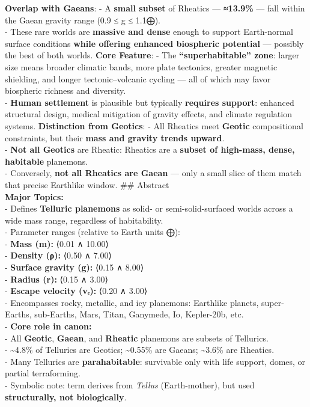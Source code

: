 \documentclass[
  letterpaper,
]{book}
\begin{document}
\textbf{Overlap with Gaeans}: - A \textbf{small subset} of Rheatics ---
\textbf{≈13.9\%} --- fall within the Gaean gravity range (0.9 ≤ g ≤
1.1⨁).\\
- These rare worlds are \textbf{massive and dense} enough to support
Earth-normal surface conditions \textbf{while offering enhanced
biospheric potential} --- possibly the best of both worlds. \textbf{Core
Feature}: - The \textbf{``superhabitable'' zone}: larger size means
broader climatic bands, more plate tectonics, greater magnetic
shielding, and longer tectonic--volcanic cycling --- all of which may
favor biospheric richness and diversity.\\
- \textbf{Human settlement} is plausible but typically \textbf{requires
support}: enhanced structural design, medical mitigation of gravity
effects, and climate regulation systems. \textbf{Distinction from
Geotics}: - All Rheatics meet \textbf{Geotic} compositional constraints,
but their \textbf{mass and gravity trends upward}.\\
- \textbf{Not all Geotics} are Rheatic: Rheatics are a \textbf{subset of
high-mass, dense, habitable} planemons.\\
- Conversely, \textbf{not all Rheatics are Gaean} --- only a small slice
of them match that precise Earthlike window. \#\# Abstract\\
\textbf{Major Topics:}\\
- Defines \textbf{Telluric planemons} as solid- or semi-solid-surfaced
worlds across a wide mass range, regardless of habitability.\\
- Parameter ranges (relative to Earth units ⨁):\\
- \textbf{Mass (m):} ⟨0.01 ∧ 10.00⟩\\
- \textbf{Density (ρ):} ⟨0.50 ∧ 7.00⟩\\
- \textbf{Surface gravity (g):} ⟨0.15 ∧ 8.00⟩\\
- \textbf{Radius (r):} ⟨0.15 ∧ 3.00⟩\\
- \textbf{Escape velocity (vₑ):} ⟨0.20 ∧ 3.00⟩\\
- Encompasses rocky, metallic, and icy planemons: Earthlike planets,
super-Earths, sub-Earths, Mars, Titan, Ganymede, Io, Kepler-20b, etc.\\
- \textbf{Core role in canon:}\\
- All \textbf{Geotic}, \textbf{Gaean}, and \textbf{Rheatic} planemons
are subsets of Tellurics.\\
- \textasciitilde4.8\% of Tellurics are Geotics; \textasciitilde0.55\%
are Gaeans; \textasciitilde3.6\% are Rheatics.\\
- Many Tellurics are \textbf{parahabitable}: survivable only with life
support, domes, or partial terraforming.\\
- Symbolic note: term derives from \emph{Tellus} (Earth-mother), but
used \textbf{structurally, not biologically}.
\end{document}
